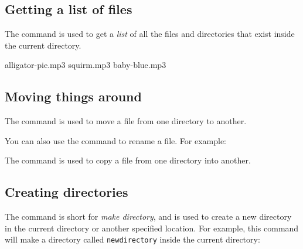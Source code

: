 \subsection{Getting a list of files}

The  command is used to get a \emph{list} of all the files and directories that exist inside the current directory.


\begin{terminal}
\prompt {}
alligator-pie.mp3
squirm.mp3
baby-blue.mp3
\end{terminal}

\subsection{Moving things around}

The  command is used to move a file from one directory to another.

\begin{terminal}
\prompt {}
\end{terminal}

You can also use the  command to rename a file. For example:

\begin{terminal}
\prompt {}
\end{terminal}

The  command is used to copy a file from one directory into another.

\begin{terminal}
\prompt {}
\end{terminal}

\subsection{Creating directories}

The  command is short for \emph{make directory}, and is used to create a new directory in the current directory or another specified location. For example, this command will make a directory called \texttt{newdirectory} inside the current directory:


